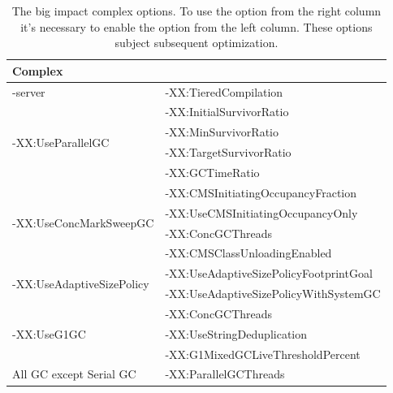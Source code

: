 \documentclass[
  digital, %
  oneside,
  notable, %
  nolof,     %
  nolot     %
]{fithesis3}
\begin{document}
\begin{table}[]
	\centering
	\begin{tabular}{|l|l|}
		\hline
		\multicolumn{2}{|l|}{\textbf{Complex}}                                              \\ \hline
		-server                                    & -XX:TieredCompilation                  \\ \hline
		\multirow{4}{*}{-XX:UseParallelGC}         & -XX:InitialSurvivorRatio               \\ \cline{2-2} 
		& -XX:MinSurvivorRatio                   \\ \cline{2-2} 
		& -XX:TargetSurvivorRatio                \\ \cline{2-2} 
		& -XX:GCTimeRatio                        \\ \hline
		\multirow{4}{*}{-XX:UseConcMarkSweepGC}    & -XX:CMSInitiatingOccupancyFraction     \\ \cline{2-2} 
		& -XX:UseCMSInitiatingOccupancyOnly      \\ \cline{2-2} 
		& -XX:ConcGCThreads                      \\ \cline{2-2} 
		& -XX:CMSClassUnloadingEnabled           \\ \hline
		\multirow{2}{*}{-XX:UseAdaptiveSizePolicy} & -XX:UseAdaptiveSizePolicyFootprintGoal \\ \cline{2-2} 
		& -XX:UseAdaptiveSizePolicyWithSystemGC  \\ \hline
		\multirow{3}{*}{-XX:UseG1GC}               & -XX:ConcGCThreads                      \\ \cline{2-2} 
		& -XX:UseStringDeduplication             \\ \cline{2-2} 
		& -XX:G1MixedGCLiveThresholdPercent      \\ \hline
		All GC except Serial GC                    & -XX:ParallelGCThreads                  \\ \hline
	\end{tabular}
	\caption{The big impact complex options. To use the option from the right column it's necessary to enable the  option from the left column. These options subject subsequent optimization.}
	\label{bigimpactcomplex}
\end{table}		
\end{document}
